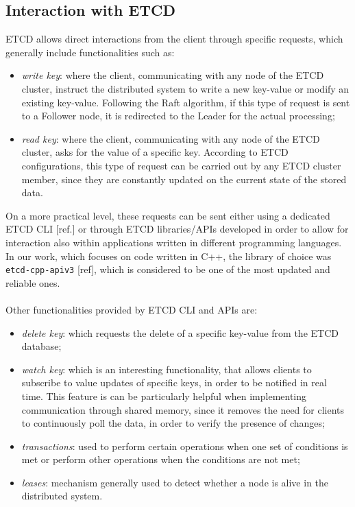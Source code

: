 \subsection{Interaction with ETCD}\label{ETCD-interaction}
ETCD allows direct interactions from the client through specific requests, which generally include functionalities such as:
\begin{itemize}
	\item \textit{write key}: where the client, communicating with any node of the ETCD cluster, instruct the distributed system to write a new key-value or modify an existing key-value. Following the Raft algorithm, if this type of request is sent to a Follower node, it is redirected to the Leader for the actual processing;
	\item \textit{read key}: where the client, communicating with any node of the ETCD cluster, asks for the value of a specific key. According to ETCD configurations, this type of request can be carried out by any ETCD cluster member, since they are constantly updated on the current state of the stored data.
\end{itemize}
On a more practical level, these requests can be sent either using a dedicated ETCD CLI [ref.] or through ETCD libraries/APIs developed in order to allow for interaction also within applications written in different programming languages. In our work, which focuses on code written in C++, the library of choice was \texttt{etcd-cpp-apiv3} [ref], which is considered to be one of the most updated and reliable ones. \\ \\
Other functionalities provided by ETCD CLI and APIs are:
\begin{itemize}
	\item \textit{delete key}: which requests the delete of a specific key-value from the ETCD database;
	\item \textit{watch key}: which is an interesting functionality, that allows clients to subscribe to value updates of specific keys, in order to be notified in real time. This feature is can be particularly helpful when implementing communication through shared memory, since it removes the need for clients to continuously poll the data, in order to verify the presence of changes;
	\item \textit{transactions}: used to perform certain operations when one set of conditions is met or perform other operations when the conditions are not met;
	\item \textit{leases}: mechanism generally used to detect whether a node is alive in the distributed system.
\end{itemize}
